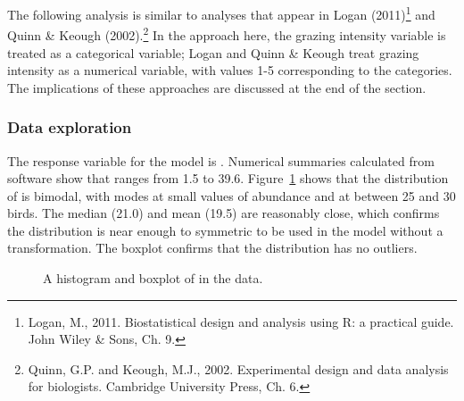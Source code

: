 The following analysis is similar to analyses that appear in Logan (2011)\footnote{Logan, M., 2011. Biostatistical design and analysis using R: a practical guide. John Wiley \& Sons, Ch. 9.} and Quinn \& Keough (2002).\footnote{Quinn, G.P. and Keough, M.J., 2002. Experimental design and data analysis for biologists. Cambridge University Press, Ch. 6.} In the approach here, the grazing intensity variable is treated as a categorical variable; Logan and Quinn \& Keough treat grazing intensity as a numerical variable, with values 1-5 corresponding to the categories. The implications of these approaches are discussed at the end of the section.


\textD{\newpage}


\subsubsection{Data exploration}

The response variable for the model is . Numerical summaries calculated from software show that  ranges from 1.5 to 39.6. Figure~\ref{forestbirdsAbundanceHistandBox} shows that the distribution of  is bimodal, with modes at small values of abundance and at between 25 and 30 birds. The median (21.0) and mean (19.5) are reasonably close, which confirms the distribution is near enough to symmetric to be used in the model without a transformation. The boxplot confirms that the distribution has no outliers.

	\begin{figure}[h]
		\centering
		\caption{A histogram  and boxplot  of  in the  data.}
		\label{forestbirdsAbundanceHistandBox}
	\end{figure}	
	
